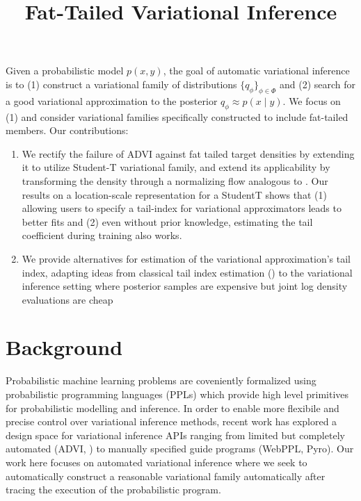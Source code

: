 \documentclass{scrartcl}
\title{Fat-Tailed Variational Inference}
\theoremstyle{definition}
\begin{document}
\maketitle

Given a probabilistic model $p(x,y)$, the goal of automatic variational
inference is to (1) construct a variational family of distributions
$\{q_\phi\}_{\phi \in \Phi}$ and (2) search for a good variational
approximation to the posterior $q_\phi \approx p(x \mid y)$.
We focus on (1) and consider variational families specifically constructed
to include fat-tailed members. Our contributions:
\begin{enumerate}
    \item We rectify the failure of ADVI against fat tailed target densities by
          extending it to utilize Student-T variational family, and extend its
          applicability by transforming the density through a normalizing flow
          analogous to \citep{webb2019improving}.
          Our results on a location-scale representation for a StudentT shows that (1)
          allowing users to specify a tail-index for variational approximators leads to
          better fits and (2) even without prior knowledge, estimating the tail
          coefficient during training also works.
    \item We provide alternatives for estimation of the variational
          approximation's tail index, adapting ideas from classical tail index
          estimation (\cite{hill1975simple,pickands1975statistical}) to the
          variational inference setting where posterior samples are expensive but
          joint log density evaluations are cheap
\end{enumerate}

\section{Background}

Probabilistic machine learning problems are coveniently formalized using
probabilistic programming languages (PPLs) which provide high level
primitives for probabilistic modelling and inference. In order to enable more
flexibile and precise control over variational inference methods, recent work
has explored a design space for variational inference APIs ranging from
limited but completely automated (ADVI, \cite{kucukelbir2017automatic}) to
manually specified guide programs (WebPPL, Pyro). Our work here focuses on
automated variational inference where we seek to automatically construct a
reasonable variational family automatically after tracing the execution of
the probabilistic program.
\end{document}
